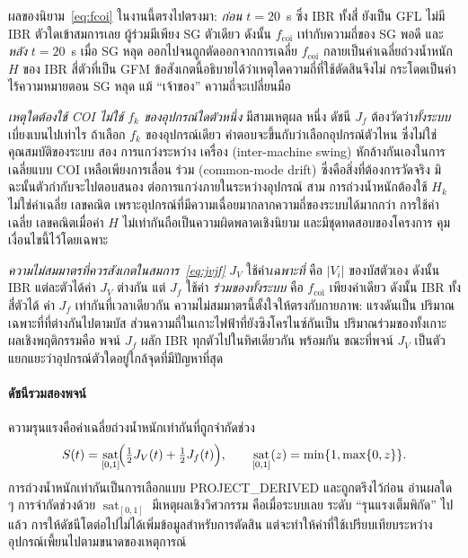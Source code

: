 \documentclass[12pt,a4paper]{article}
\DeclareMathOperator{\sat}{sat}
\begin{document}
ผลของนิยาม~\eqref{eq:fcoi} ในงานนี้ตรงไปตรงมา: \emph{ก่อน} $t=20$~s ซึ่ง IBR ทั้งสี่
ยังเป็น GFL ไม่มี IBR ตัวใดเข้าสมการเลย ผู้ร่วมมีเพียง SG ตัวเดียว ดังนั้น
$f_{\mathrm{coi}}$ เท่ากับความถี่ของ SG พอดี และ\emph{หลัง} $t=20$~s เมื่อ SG หลุด
ออกไปจนถูกตัดออกจากการเฉลี่ย $f_{\mathrm{coi}}$ กลายเป็นค่าเฉลี่ยถ่วงน้ำหนัก $H$
ของ IBR สี่ตัวที่เป็น GFM ข้อสังเกตนี้อธิบายได้ว่าเหตุใดความถี่ที่ใช้ตัดสินจึงไม่
กระโดดเป็นค่าไร้ความหมายตอน SG หลุด แม้ ``เจ้าของ'' ความถี่จะเปลี่ยนมือ

\emph{เหตุใดต้องใช้ COI ไม่ใช้ $f_k$ ของอุปกรณ์ใดตัวหนึ่ง} มีสามเหตุผล หนึ่ง ดัชนี
$J_f$ ต้องวัดว่า\emph{ทั้งระบบ}เบี่ยงเบนไปเท่าไร ถ้าเลือก $f_k$ ของอุปกรณ์เดียว
คำตอบจะขึ้นกับว่าเลือกอุปกรณ์ตัวไหน ซึ่งไม่ใช่คุณสมบัติของระบบ สอง การแกว่งระหว่าง
เครื่อง (inter-machine swing) หักล้างกันเองในการเฉลี่ยแบบ COI เหลือเพียงการเลื่อน
ร่วม (common-mode drift) ซึ่งคือสิ่งที่ต้องการวัดจริง มิฉะนั้นตัวกำกับจะไปตอบสนอง
ต่อการแกว่งภายในระหว่างอุปกรณ์ สาม การถ่วงน้ำหนักต้องใช้ $H_k$ ไม่ใช่ค่าเฉลี่ย
เลขคณิต เพราะอุปกรณ์ที่มีความเฉื่อยมากลากความถี่ของระบบได้มากกว่า การใช้ค่าเฉลี่ย
เลขคณิตเมื่อค่า $H$ ไม่เท่ากันถือเป็นความผิดพลาดเชิงนิยาม และมีชุดทดสอบของโครงการ
คุมเงื่อนไขนี้ไว้โดยเฉพาะ

\emph{ความไม่สมมาตรที่ควรสังเกตในสมการ~\eqref{eq:jvjf}} $J_V$ ใช้ค่า\emph{เฉพาะที่}
คือ $|V_i|$ ของบัสตัวเอง ดังนั้น IBR แต่ละตัวได้ค่า $J_V$ ต่างกัน แต่ $J_f$ ใช้ค่า
\emph{ร่วมของทั้งระบบ} คือ $f_{\mathrm{coi}}$ เพียงค่าเดียว ดังนั้น IBR ทั้งสี่ตัวได้
ค่า $J_f$ เท่ากันที่เวลาเดียวกัน ความไม่สมมาตรนี้ตั้งใจให้ตรงกับกายภาพ: แรงดันเป็น
ปริมาณเฉพาะที่ที่ต่างกันไปตามบัส ส่วนความถี่ในเกาะไฟฟ้าที่ยังซิงโครไนซ์กันเป็น
ปริมาณร่วมของทั้งเกาะ ผลเชิงพฤติกรรมคือ พจน์ $J_f$ ผลัก IBR ทุกตัวไปในทิศเดียวกัน
พร้อมกัน ขณะที่พจน์ $J_V$ เป็นตัวแยกแยะว่าอุปกรณ์ตัวใดอยู่ใกล้จุดที่มีปัญหาที่สุด

\paragraph{ดัชนีรวมสองพจน์}
ความรุนแรงคือค่าเฉลี่ยถ่วงน้ำหนักเท่ากันที่ถูกจำกัดช่วง
\begin{equation}
  S(t)=\sat_{[0,1]}\!\Bigl(\tfrac12 J_V(t)+\tfrac12 J_f(t)\Bigr),
  \qquad
  \sat_{[0,1]}(z)=\min\{1,\max\{0,z\}\}.
  \label{eq:agsi}
\end{equation}
การถ่วงน้ำหนักเท่ากันเป็นการเลือกแบบ \textsf{PROJECT\_DERIVED} และถูกตรึงไว้ก่อน
อ่านผลใด ๆ การจำกัดช่วงด้วย $\sat_{[0,1]}$ มีเหตุผลเชิงวิศวกรรม คือเมื่อระบบเลย
ระดับ ``รุนแรงเต็มพิกัด'' ไปแล้ว การให้ดัชนีโตต่อไปไม่ได้เพิ่มข้อมูลสำหรับการตัดสิน
แต่จะทำให้ค่าที่ใช้เปรียบเทียบระหว่างอุปกรณ์เพี้ยนไปตามขนาดของเหตุการณ์
\end{document}
